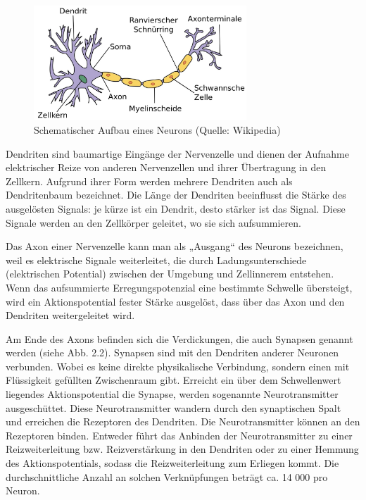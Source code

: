 \begin{figure}[h]
\centering
\includegraphics[width=8cm]{chapters/neural_networks/neuron.jpg}

\caption{Schematischer Aufbau eines Neurons (Quelle: Wikipedia)}
	\label{img:neuron}

\end{figure}
Dendriten sind baumartige Eingänge der Nervenzelle und dienen der Aufnahme elektrischer Reize von anderen Nervenzellen und ihrer Übertragung in den Zellkern. Aufgrund ihrer Form werden mehrere Dendriten auch als Dendritenbaum bezeichnet. Die Länge der Dendriten beeinflusst die Stärke des ausgelösten Signals: je kürze ist ein Dendrit, desto stärker ist das Signal. Diese Signale werden an den Zellkörper geleitet, wo sie sich aufsummieren.

Das Axon einer Nervenzelle kann man als „Ausgang“ des Neurons bezeichnen, weil es elektrische Signale weiterleitet, die durch Ladungsunterschiede (elektrischen Potential) zwischen der Umgebung und Zellinnerem entstehen. Wenn das aufsummierte Erregungspotenzial eine bestimmte Schwelle übersteigt, wird ein Aktionspotential fester Stärke ausgelöst, dass über das Axon und den Dendriten weitergeleitet wird.

Am Ende des Axons befinden sich die Verdickungen, die auch Synapsen genannt werden (siehe Abb. 2.2). Synapsen sind mit den Dendriten anderer Neuronen verbunden. Wobei es keine direkte physikalische Verbindung, sondern einen mit Flüssigkeit gefüllten Zwischenraum gibt. Erreicht ein über dem Schwellenwert liegendes Aktionspotential die Synapse, werden sogenannte Neurotransmitter ausgeschüttet. Diese Neurotransmitter wandern durch den synaptischen Spalt und erreichen die Rezeptoren des Dendriten. Die Neurotransmitter können an den Rezeptoren binden. Entweder führt das Anbinden der Neurotransmitter zu einer Reizweiterleitung bzw. Reizverstärkung in den Dendriten oder zu einer Hemmung des Aktionspotentials, sodass die Reizweiterleitung zum Erliegen kommt.  Die durchschnittliche Anzahl an solchen Verknüpfungen beträgt ca. 14 000 pro Neuron.

